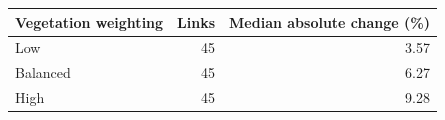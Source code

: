 \begin{tabular}{lrr}
\toprule
Vegetation weighting & Links & Median absolute change (\%)\\
\midrule
Low & 45 & 3.57\\
Balanced & 45 & 6.27\\
High & 45 & 9.28\\
\bottomrule
\end{tabular}
\\[0.5em]
\noindent{}

